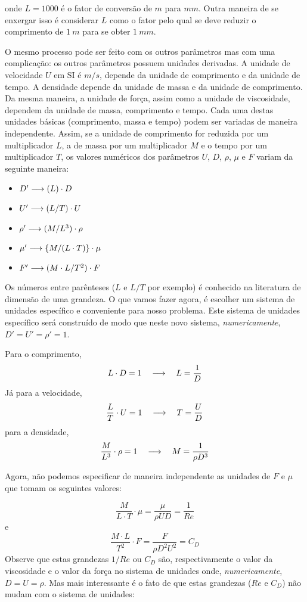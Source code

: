 onde $L = 1000$ é o fator de conversão de $m$ para $mm$. Outra maneira de se enxergar isso é considerar $L$ como o fator pelo qual se deve reduzir o comprimento de $1\:m$ para se obter $1\:mm$.

O mesmo processo pode ser feito com os outros parâmetros mas com uma complicação: os outros parâmetros possuem unidades derivadas. A unidade de velocidade $U$ em SI é $m/s$, depende da unidade de comprimento e da unidade de tempo. A densidade depende da unidade de massa e da unidade de comprimento. Da mesma maneira, a unidade de força, assim como a unidade de viscosidade,  dependem da unidade de massa, comprimento e tempo. Cada uma destas unidades básicas (comprimento, massa e tempo) podem ser variadas de maneira independente. Assim, se a unidade de comprimento for reduzida por um multiplicador $L$, a de massa por um multiplicador $M$ e o tempo por um multiplicador $T$, os valores numéricos dos parâmetros $U$, $D$, $\rho$, $\mu$ e $F$ variam da seguinte maneira:

\begin{itemize}
\item $D' \longrightarrow (L) \cdot D$
\item $U' \longrightarrow (L/T) \cdot U$
\item $\rho' \longrightarrow  (M/L^3) \cdot\rho$
\item $\mu' \longrightarrow \{M/(L\cdot T)\}\cdot\mu$
\item $F' \longrightarrow (M \cdot L / T^2) \cdot F$
\end{itemize}

Os números entre parênteses ($L$ e $L/T$ por exemplo) é conhecido na literatura de dimensão de uma grandeza. O que vamos fazer agora, é escolher um sistema de unidades específico e conveniente para nosso problema. Este sistema de unidades específico será construído de modo que neste novo sistema, \emph{numericamente}, $D' = U' = \rho' = 1$.

Para o comprimento,
\[
L \cdot D = 1 \quad\longrightarrow\quad L = \frac{1}{D}
\]
Já para a velocidade,
\[
\frac{L}{T} \cdot U = 1 \quad\longrightarrow\quad T = \frac{U}{D}
\]
para a densidade,
\[
\frac{M}{L^3} \cdot \rho = 1 \quad\longrightarrow\quad M = \frac{1}{\rho D^3}
\]

Agora, não podemos especificar de maneira independente as unidades de $F$ e $\mu$ que tomam os seguintes valores:

\[
\frac{M}{L\cdot T} \cdot \mu = \frac{\mu}{\rho U D} = \frac{1}{Re}
\]
e
\[
\frac{M\cdot L}{T^2} \cdot F = \frac{F}{\rho D^2 U^2} = C_D
\]
Observe que estas grandezas $1/Re$ ou $C_D$ são, respectivamente o valor da viscosidade e o valor da força no sistema de unidades onde, \emph{numericamente},  $D = U = \rho$. Mas mais interessante é o fato de que estas grandezas ($Re$ e $C_D$)  não mudam com o sistema de unidades:

